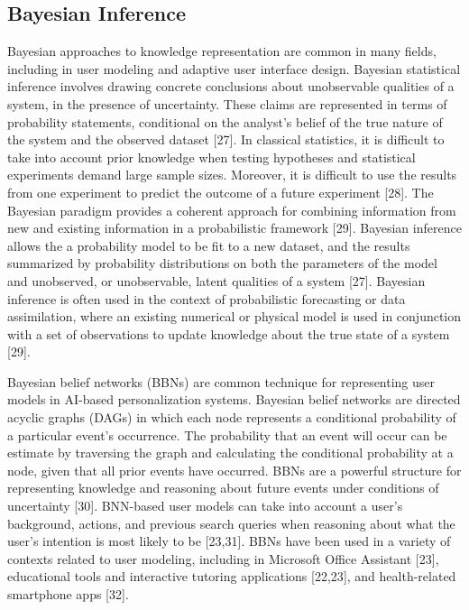 \documentclass[]{article}
\begin{document}
\subsection{Bayesian Inference}\label{bayesian-inference}

Bayesian approaches to knowledge representation are common in many
fields, including in user modeling and adaptive user interface design.
Bayesian statistical inference involves drawing concrete conclusions
about unobservable qualities of a system, in the presence of
uncertainty. These claims are represented in terms of probability
statements, conditional on the analyst's belief of the true nature of
the system and the observed dataset {[}27{]}. In classical statistics,
it is difficult to take into account prior knowledge when testing
hypotheses and statistical experiments demand large sample sizes.
Moreover, it is difficult to use the results from one experiment to
predict the outcome of a future experiment {[}28{]}. The Bayesian
paradigm provides a coherent approach for combining information from new
and existing information in a probabilistic framework {[}29{]}. Bayesian
inference allows the a probability model to be fit to a new dataset, and
the results summarized by probability distributions on both the
parameters of the model and unobserved, or unobservable, latent
qualities of a system {[}27{]}. Bayesian inference is often used in the
context of probabilistic forecasting or data assimilation, where an
existing numerical or physical model is used in conjunction with a set
of observations to update knowledge about the true state of a system
{[}29{]}.

Bayesian belief networks (BBNs) are common technique for representing
user models in AI-based personalization systems. Bayesian belief
networks are directed acyclic graphs (DAGs) in which each node
represents a conditional probability of a particular event's occurrence.
The probability that an event will occur can be estimate by traversing
the graph and calculating the conditional probability at a node, given
that all prior events have occurred. BBNs are a powerful structure for
representing knowledge and reasoning about future events under
conditions of uncertainty {[}30{]}. BNN-based user models can take into
account a user's background, actions, and previous search queries when
reasoning about what the user's intention is most likely to be
{[}23,31{]}. BBNs have been used in a variety of contexts related to
user modeling, including in Microsoft Office Assistant {[}23{]},
educational tools and interactive tutoring applications {[}22,23{]}, and
health-related smartphone apps {[}32{]}.
\end{document}
